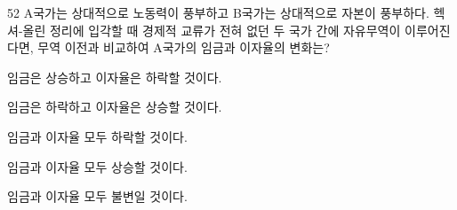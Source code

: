 \begin{question}{52}
A국가는 상대적으로 노동력이 풍부하고 B국가는 상대적으로 자본이 풍부하다. 헥셔-올린 정리에 입각할 때 경제적 교류가 전혀 없던 두 국가 간에 자유무역이 이루어진다면, 무역 이전과 비교하여 A국가의 임금과 이자율의 변화는?
\begin{choices}
  \item 임금은 상승하고 이자율은 하락할 것이다.
  \item 임금은 하락하고 이자율은 상승할 것이다.
  \item 임금과 이자율 모두 하락할 것이다.
  \item 임금과 이자율 모두 상승할 것이다.
  \item 임금과 이자율 모두 불변일 것이다.
\end{choices}
\end{question}

